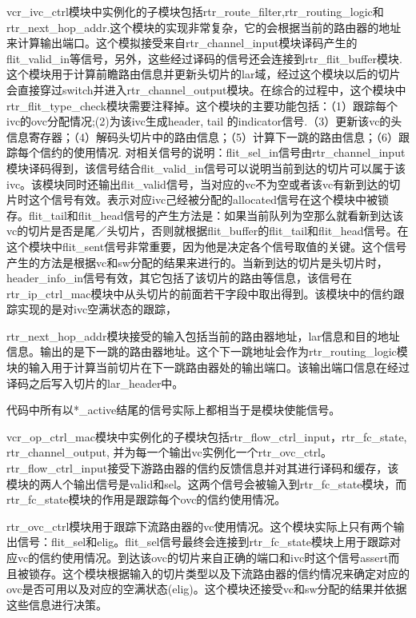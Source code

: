 ﻿\documentclass[10pt,journal]{IEEEtran}
\begin{document}
vcr\_ivc\_ctrl模块中实例化的子模块包括rtr\_route\_filter,rtr\_routing\_logic和rtr\_next\_hop\_addr.这个模块的实现非常复杂，它的会根据当前的路由器的地址来计算输出端口。这个模拟接受来自rtr\_channel\_input模块译码产生的flit\_valid\_in等信号，另外，这些经过译码的信号还会连接到rtr\_flit\_buffer模块.这个模块用于计算前瞻路由信息并更新头切片的lar域，经过这个模块以后的切片会直接穿过switch并进入rtr\_channel\_output模块。在综合的过程中，这个模块中rtr\_flit\_type\_check模块需要注释掉。这个模块的主要功能包括：（1）跟踪每个ivc的ovc分配情况;(2)为该ivc生成header, tail 的indicator信号.（3）更新该vc的头信息寄存器；（4）解码头切片中的路由信息；（5）计算下一跳的路由信息；（6）跟踪每个信约的使用情况. 对相关信号的说明：flit\_sel\_in信号由rtr\_channel\_input模块译码得到，该信号结合flit\_valid\_in信号可以说明当前到达的切片可以属于该ivc。该模块同时还输出flit\_valid信号，当对应的vc不为空或者该vc有新到达的切片时这个信号有效。表示对应ivc己经被分配的allocated信号在这个模块中被锁存。flit\_tail和flit\_head信号的产生方法是：如果当前队列为空那么就看新到达该vc的切片是否是尾／头切片，否则就根据flit\_buffer的flit\_tail和flit\_head信号。在这个模块中flit\_sent信号非常重要，因为他是决定各个信号取值的关键。这个信号产生的方法是根据vc和sw分配的结果来进行的。当新到达的切片是头切片时，header\_info\_in信号有效，其它包括了该切片的路由等信息，该信号在rtr\_ip\_ctrl\_mac模块中从头切片的前面若干字段中取出得到。该模块中的信约跟踪实现的是对ivc空满状态的跟踪，

rtr\_next\_hop\_addr模块接受的输入包括当前的路由器地址，lar信息和目的地址信息。输出的是下一跳的路由器地址。这个下一跳地址会作为rtr\_routing\_logic模块的输入用于计算当前切片在下一跳路由器处的输出端口。该输出端口信息在经过译码之后写入切片的lar\_header中。

代码中所有以*\_active结尾的信号实际上都相当于是模块使能信号。

vcr\_op\_ctrl\_mac模块中实例化的子模块包括rtr\_flow\_ctrl\_input，rtr\_fc\_state, rtr\_channel\_output, 并为每一个输出vc实例化一个rtr\_ovc\_ctrl。rtr\_flow\_ctrl\_input接受下游路由器的信约反馈信息并对其进行译码和缓存，该模块的两人个输出信号是valid和sel。这两个信号会被输入到rtr\_fc\_state模块，而rtr\_fc\_state模块的作用是跟踪每个ovc的信约使用情况。

rtr\_ovc\_ctrl模块用于跟踪下流路由器的vc使用情况。这个模块实际上只有两个输出信号：flit\_sel和elig。flit\_sel信号最终会连接到rtr\_fc\_state模块上用于跟踪对应vc的信约使用情况。到达该ovc的切片来自正确的端口和ivc时这个信号assert而且被锁存。这个模块根据输入的切片类型以及下流路由器的信约情况来确定对应的ovc是否可用以及对应的空满状态(elig)。这个模块还接受vc和sw分配的结果并依据这些信息进行决策。
\end{document}

